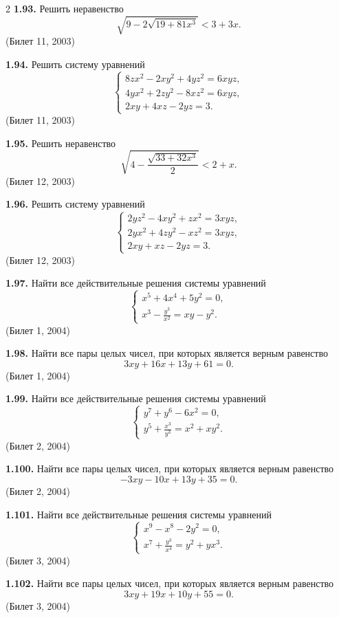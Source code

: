 \documentclass[14pt,a4paper,landscape]{extarticle}
\begin{document}
\begin{multicols}{2}
\textbf{1.93.} Решить неравенство
\[
\sqrt{9 - 2\sqrt{19 + 81x^3}} < 3 + 3x.
\]
\hfill \textnormal{(Билет 11, 2003)}

\textbf{1.94.} Решить систему уравнений
\[
\begin{cases}
8zx^2 - 2xy^2 + 4yz^2 = 6xyz, \\
4yx^2 + 2zy^2 - 8xz^2 = 6xyz, \\
2xy + 4xz - 2yz = 3.
\end{cases}
\]
\hfill \textnormal{(Билет 11, 2003)}

\textbf{1.95.} Решить неравенство
\[
\sqrt{4 - \frac{\sqrt{33 + 32x^3}}{2}} < 2 + x.
\]
\hfill \textnormal{(Билет 12, 2003)}

\textbf{1.96.} Решить систему уравнений
\[
\begin{cases}
2yz^2 - 4xy^2 + zx^2 = 3xyz, \\
2yx^2 + 4zy^2 - xz^2 = 3xyz, \\
2xy + xz - 2yz = 3.
\end{cases}
\]
\hfill \textnormal{(Билет 12, 2003)}

\textbf{1.97.} Найти все действительные решения системы уравнений
\[
\begin{cases}
x^5 + 4x^4 + 5y^2 = 0, \\[1ex]
x^3 - \frac{y^3}{x^2} = xy - y^2.
\end{cases}
\]
\hfill \textnormal{(Билет 1, 2004)}

\textbf{1.98.} Найти все пары целых чисел, при которых является верным равенство
\[
3xy + 16x + 13y + 61 = 0.
\]
\hfill \textnormal{(Билет 1, 2004)}

\textbf{1.99.} Найти все действительные решения системы уравнений
\[
\begin{cases}
y^7 + y^6 - 6x^2 = 0, \\[1ex]
y^5 + \frac{x^3}{y^3} = x^2 + xy^2.
\end{cases}
\]
\hfill \textnormal{(Билет 2, 2004)}

\textbf{1.100.} Найти все пары целых чисел, при которых является верным равенство
\[
-3xy - 10x + 13y + 35 = 0.
\]
\hfill \textnormal{(Билет 2, 2004)}

\textbf{1.101.} Найти все действительные решения системы уравнений
\[
\begin{cases}
x^9 - x^8 - 2y^2 = 0, \\[1ex]
x^7 + \frac{y^3}{x^4} = y^2 + yx^3.
\end{cases}
\]
\hfill \textnormal{(Билет 3, 2004)}

\textbf{1.102.} Найти все пары целых чисел, при которых является верным равенство
\[
3xy + 19x + 10y + 55 = 0.
\]
\hfill \textnormal{(Билет 3, 2004)}


\end{multicols}
\end{document}

